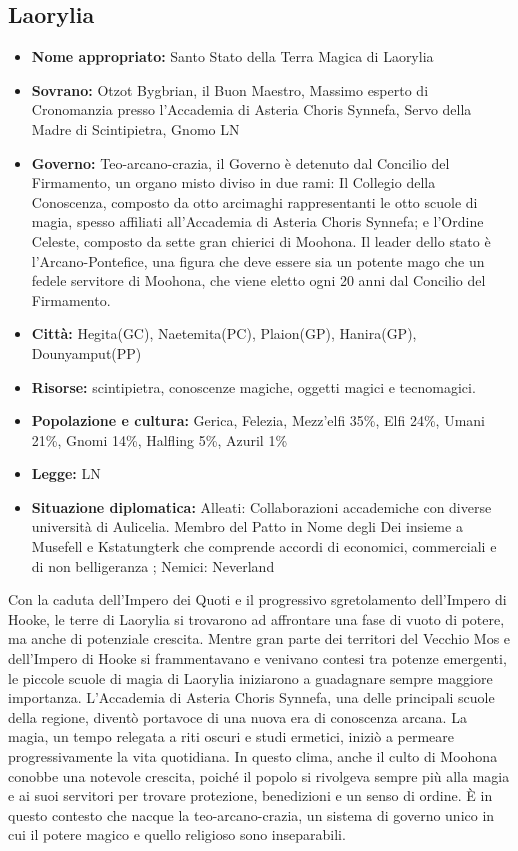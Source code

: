 \documentclass[10pt, a4paper]{report}
\begin{document}
\begin{multicols}{2}
\subsection*{Laorylia}
\begin{itemize}
	\item \textbf{Nome appropriato:} Santo Stato della Terra Magica di Laorylia
	\item \textbf{Sovrano:} Otzot Bygbrian, il Buon Maestro, Massimo esperto di Cronomanzia presso l'Accademia di Asteria Choris Synnefa, Servo della Madre di Scintipietra, Gnomo LN
	\item \textbf{Governo:} Teo-arcano-crazia, il Governo è detenuto dal Concilio del Firmamento, un organo misto diviso in due rami: Il Collegio della Conoscenza, composto da otto arcimaghi rappresentanti le otto scuole di magia, spesso affiliati all'Accademia di Asteria Choris Synnefa; e l'Ordine Celeste, composto da sette gran chierici di Moohona. Il leader dello stato è l'Arcano-Pontefice, una figura che deve essere sia un potente mago che un fedele servitore di Moohona, che viene eletto ogni 20 anni dal Concilio del Firmamento.
	\item \textbf{Città:} Hegita(GC), Naetemita(PC), Plaion(GP), Hanira(GP), Dounyamput(PP)
	\item \textbf{Risorse:} scintipietra, conoscenze magiche, oggetti magici e tecnomagici.
	\item \textbf{Popolazione e cultura:} Gerica, Felezia, Mezz'elfi 35\%, Elfi 24\%, Umani 21\%, Gnomi 14\%, Halfling 5\%, Azuril 1\%
	\item \textbf{Legge:} LN
	\item \textbf{Situazione diplomatica:} Alleati: Collaborazioni accademiche con diverse università di Aulicelia. Membro del Patto in Nome degli Dei insieme a Musefell e Kstatungterk che comprende accordi di economici, commerciali e di non belligeranza ; Nemici: Neverland
\end{itemize}
Con la caduta dell’Impero dei Quoti e il progressivo sgretolamento dell’Impero di Hooke, le terre di Laorylia si trovarono ad affrontare una fase di vuoto di potere, ma anche di potenziale crescita. Mentre gran parte dei territori del Vecchio Mos e dell’Impero di Hooke si frammentavano e venivano contesi tra potenze emergenti, le piccole scuole di magia di Laorylia iniziarono a guadagnare sempre maggiore importanza. L’Accademia di Asteria Choris Synnefa, una delle principali scuole della regione, diventò portavoce di una nuova era di conoscenza arcana. La magia, un tempo relegata a riti oscuri e studi ermetici, iniziò a permeare progressivamente la vita quotidiana. In questo clima, anche il culto di Moohona conobbe una notevole crescita, poiché il popolo si rivolgeva sempre più alla magia e ai suoi servitori per trovare protezione, benedizioni e un senso di ordine. È in questo contesto che nacque la teo-arcano-crazia, un sistema di governo unico in cui il potere magico e quello religioso sono inseparabili.

\end{multicols}
\end{document}
